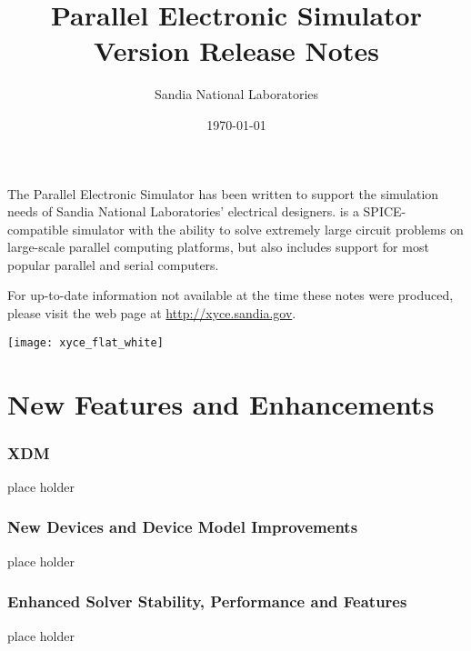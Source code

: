 \documentclass[letterpaper]{scrartcl}
\title{\XyceTitle{} Parallel Electronic Simulator\\
Version \XyceVersionVar{} Release Notes}
\author{ Sandia National Laboratories}
\date{\today}
\begin{document}
\maketitle

The \XyceTM{} Parallel Electronic Simulator has been written to support the
simulation needs of Sandia National Laboratories' electrical designers.
\XyceTM{} is a SPICE-compatible simulator with the ability to solve extremely
large circuit problems on large-scale parallel computing platforms, but also
includes support for most popular parallel and serial computers.

For up-to-date information not available at the time these notes were produced,
please visit the \XyceTM{} web page at
{\color{XyceDeepRed}\url{http://xyce.sandia.gov}}.

\tableofcontents
\vspace*{\fill}
\parbox{\textwidth}
{
  \hfill
  \texttt{[image: xyce\_flat\_white]}
}


\newpage
\section{New Features and Enhancements}

\subsubsection*{XDM}
\begin{XyceItemize}
  \item place holder
\end{XyceItemize}

\subsubsection*{New Devices and Device Model Improvements}
\begin{XyceItemize}
  \item place holder
\end{XyceItemize}

\subsubsection*{Enhanced Solver Stability, Performance and Features}
\begin{XyceItemize}
  \item place holder
\end{XyceItemize}
\end{document}
